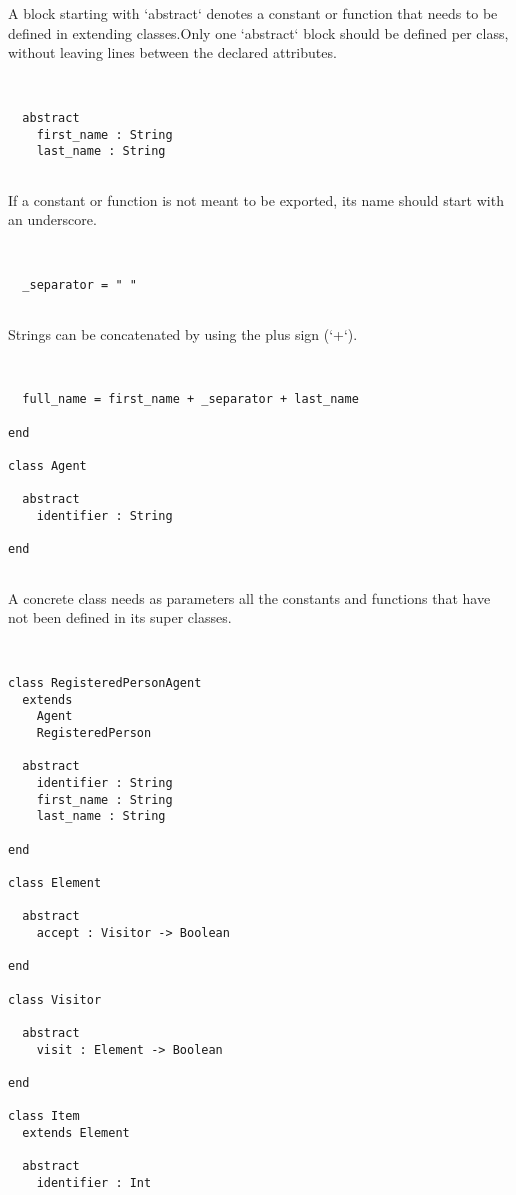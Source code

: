 \documentclass[12pt,a4paper]{article}
\begin{document}
A block starting with `abstract` denotes a constant or function that needs to be defined in extending classes.Only one `abstract` block should be defined per class, without leaving lines between the declared attributes. 


\begin{lstlisting}


  abstract
    first_name : String
    last_name : String


\end{lstlisting}

If a constant or function is not meant to be exported, its name should start with an underscore. 


\begin{lstlisting}


  _separator = " "


\end{lstlisting}

Strings can be concatenated by using the plus sign (`+`). 


\begin{lstlisting}


  full_name = first_name + _separator + last_name

end

class Agent

  abstract
    identifier : String

end


\end{lstlisting}

A concrete class needs as parameters all the constants and functions that have not been defined in its super classes. 


\begin{lstlisting}


class RegisteredPersonAgent
  extends
    Agent
    RegisteredPerson

  abstract
    identifier : String
    first_name : String
    last_name : String

end

class Element

  abstract
    accept : Visitor -> Boolean

end

class Visitor

  abstract
    visit : Element -> Boolean

end

class Item
  extends Element

  abstract
    identifier : Int


\end{lstlisting}
\end{document}

